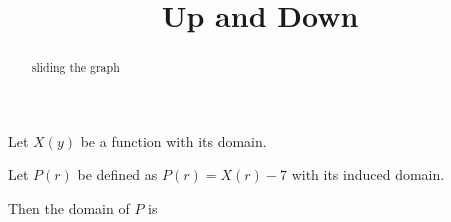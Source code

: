 \documentclass{ximera}
\title{Up and Down}
\begin{document}
\begin{abstract}
sliding the graph
\end{abstract}
\maketitle











Let $X(y)$ be a function with its domain.

Let $P(r)$ be defined as $P(r) = X(r)-7$ with its induced domain.


Then the domain of $P$ is

\begin{multipleChoice}
\end{multipleChoice}
\end{document}

